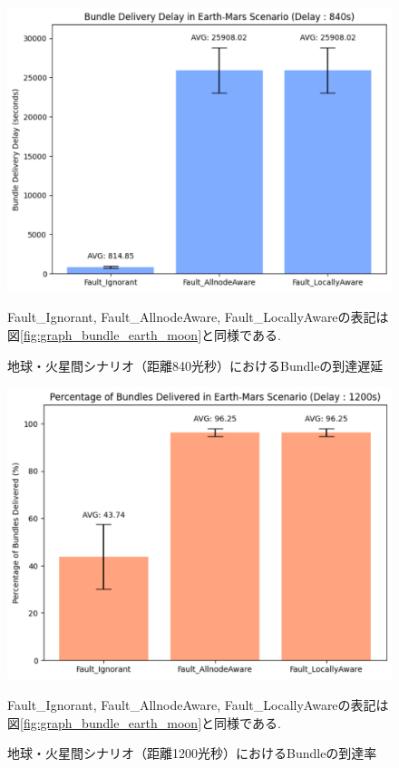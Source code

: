 \begin{figure}[tbh]
    \centering
    \includegraphics[width=0.7\textheight]{img/mars_840_delay.pdf}
    \caption{地球・火星間シナリオ（距離840光秒）におけるBundleの到達遅延}
    \label{fig:graph_delay_earth_mars_840}
    \begin{minipage}{\textwidth}
        \centering
        \vspace{3mm}
        \fontsize{10.5pt}{12pt}\selectfont
        Fault\_Ignorant, Fault\_AllnodeAware, Fault\_LocallyAwareの表記は
        図\ref{fig:graph_bundle_earth_moon}と同様である.
    \end{minipage}
\end{figure}

\begin{figure}[tbh]
    \centering
    \includegraphics[width=0.7\textheight]{img/mars_1200_bundle.pdf}
    \caption{地球・火星間シナリオ（距離1200光秒）におけるBundleの到達率}
    \label{fig:graph_bundle_earth_mars_1200}
    \begin{minipage}{\textwidth}
        \centering
        \vspace{3mm}
        \fontsize{10.5pt}{12pt}\selectfont
        Fault\_Ignorant, Fault\_AllnodeAware, Fault\_LocallyAwareの表記は
        図\ref{fig:graph_bundle_earth_moon}と同様である.
    \end{minipage}
\end{figure}

